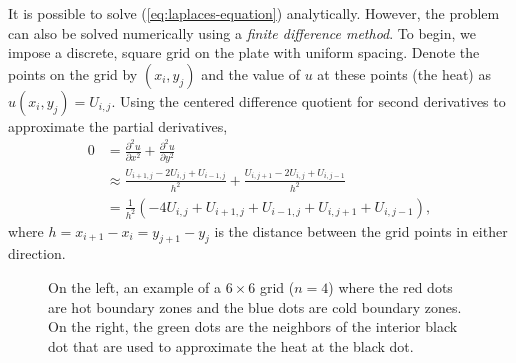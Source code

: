 It is possible to solve (\ref{eq:laplaces-equation}) analytically.
However, the problem can also be solved numerically using a \emph{finite difference method}.
To begin, we impose a discrete, square grid on the plate with uniform spacing.
Denote the points on the grid by $(x_i,y_j)$ and the value of $u$ at these points (the heat) as $u(x_i,y_j) = U_{i,j}$.
Using the centered difference quotient for second derivatives to approximate the partial derivatives,
%
\begin{align}
\nonumber 0 &= \frac{\partial^2 u}{\partial x^2}+ \frac{\partial^2 u}{\partial y^2}\\
\nonumber &\approx \frac{U_{i+1,j}-2U_{i,j}+U_{i-1,j}}{h^2} + \frac{U_{i,j+1}-2U_{i,j}+U_{i,j-1}}{h^2}\\
&= \frac{1}{h^2}\left(-4U_{i,j} + U_{i+1,j} + U_{i-1,j} + U_{i,j+1} +  U_{i,j-1}\right),
\label{eq:laplace-finite-diff}
\end{align}
where $h = x_{i+1} - x_i = y_{j+1} - y_j$ is the distance between the grid points in either direction.
%
\begin{figure}
\centering
{}
\caption{On the left, an example of a $6\times 6$ grid ($n=4$) where the red dots are hot boundary zones and the blue dots are cold boundary zones.
On the right, the green dots are the neighbors of the interior black dot that are used to approximate the heat at the black dot.}
\label{fig:itersolve-finite-difference-grid}
\end{figure}
